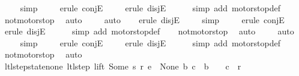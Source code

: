 \begin{isabellebody}
\ \ \ \isamarkupfalse%
\ simp\isanewline
\ \ \ \isamarkupfalse%
\ {\isacharparenleft}erule\ conjE{\isacharparenright}\isanewline
\ \ \ \isamarkupfalse%
\ {\isacharparenleft}erule\ disjE{\isacharparenright}\isanewline
\ \ \ \ \isamarkupfalse%
\ {\isacharparenleft}simp\ add{\isacharcolon}\ motorstop{}{\isacharunderscore}def{\isacharparenright}\isanewline
\ \ \isamarkupfalse%
\ not{\isacharunderscore}motorstop\ \isamarkupfalse%
\ auto{\isacharbrackleft}{}{\isacharbrackright}\isanewline
\ \ \ \isamarkupfalse%
\ auto{\isacharbrackleft}{}{\isacharbrackright}\isanewline
\ \ \isamarkupfalse%
\ {\isacharparenleft}erule\ disjE{\isacharparenright}\isanewline
\ \ \ \isamarkupfalse%
\ simp\isanewline
\ \ \ \isamarkupfalse%
\ {\isacharparenleft}erule\ conjE{\isacharparenright}\isanewline
\ \ \ \isamarkupfalse%
\ {\isacharparenleft}erule\ disjE{\isacharparenright}\isanewline
\ \ \ \ \isamarkupfalse%
\ {\isacharparenleft}simp\ add{\isacharcolon}\ motorstop{}{\isacharunderscore}def{\isacharparenright}\isanewline
\ \ \isamarkupfalse%
\ not{\isacharunderscore}motorstop\ \isamarkupfalse%
\ auto{\isacharbrackleft}{}{\isacharbrackright}\isanewline
\ \ \ \isamarkupfalse%
\ auto{\isacharbrackleft}{}{\isacharbrackright}\isanewline
\ \ \ \isamarkupfalse%
\ simp\isanewline
\ \ \ \isamarkupfalse%
\ {\isacharparenleft}erule\ conjE{\isacharparenright}\isanewline
\ \ \ \isamarkupfalse%
\ {\isacharparenleft}erule\ disjE{\isacharparenright}\isanewline
\ \ \ \ \isamarkupfalse%
\ {\isacharparenleft}simp\ add{\isacharcolon}\ motorstop{}{\isacharunderscore}def{\isacharparenright}\isanewline
\ \ \isamarkupfalse%
\ not{\isacharunderscore}motorstop\ \isamarkupfalse%
\ auto%
\endisatagproof
{\isafoldproof}%
%
\isadelimproof
\isanewline
%
\endisadelimproof
\isanewline
{}\isamarkupfalse%
\ ltl{\isacharunderscore}step{\isacharunderscore}state{\isacharunderscore}none{\isacharcolon}\ {\isachardoublequoteopen}{\isacharparenleft}ltl{\isacharunderscore}step\ lift\ {\isacharparenleft}Some\ s{\isacharparenright}\ r\ e\ {\isacharequal}\ {\isacharparenleft}None{\isacharcomma}\ b{\isacharcomma}\ c{\isacharparenright}{\isacharparenright}\ {\isasymLongrightarrow}\ b\ {\isacharequal}\ {\isacharbrackleft}{\isacharbrackright}\ {\isasymand}\ c\ {\isacharequal}\ r{\isachardoublequoteclose}\isanewline

\end{isabellebody}
